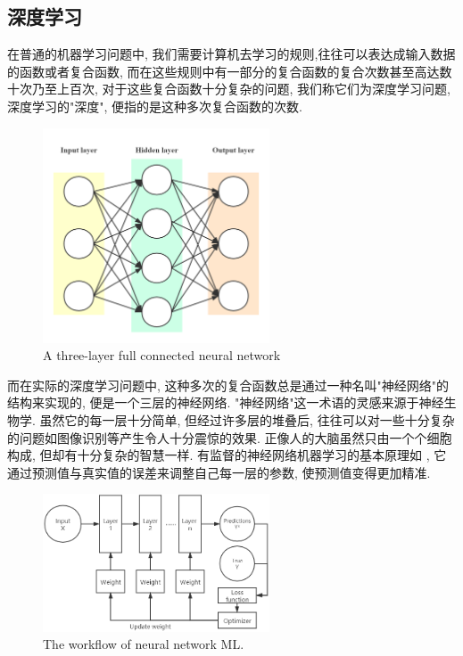 \documentclass[lang=cn,11pt,a4paper]{elegantpaper}
\begin{document}
\subsection{深度学习}
\par 在普通的机器学习问题中, 我们需要计算机去学习的规则,往往可以表达成输入数据的函数或者复合函数, 而在这些规则中有一部分的复合函数的复合次数甚至高达数十次乃至上百次, 对于这些复合函数十分复杂的问题, 我们称它们为深度学习问题, 深度学习的"深度", 便指的是这种多次复合函数的次数. 
\begin{figure}[htbp]
	\centering
	\includegraphics[width=0.6\textwidth]{DNN}
  	\caption{A three-layer full connected neural network\label{fig:DNN}}
\end{figure}
\par 而在实际的深度学习问题中, 这种多次的复合函数总是通过一种名叫"神经网络"的结构来实现的,  \cite{net} 便是一个三层的神经网络. "神经网络"这一术语的灵感来源于神经生物学. 虽然它的每一层十分简单, 但经过许多层的堆叠后, 往往可以对一些十分复杂的问题如图像识别等产生令人十分震惊的效果. 正像人的大脑虽然只由一个个细胞构成, 但却有十分复杂的智慧一样. 有监督的神经网络机器学习的基本原理如 , 它通过预测值与真实值的误差来调整自己每一层的参数, 使预测值变得更加精准.
\begin{figure}[htbp]
	\centering
	\hspace{-30pt}\includegraphics[width=0.6\textwidth]{Net}
  	\caption{The workflow of neural network ML.\label{fig:net}}
\end{figure}
\end{document}
